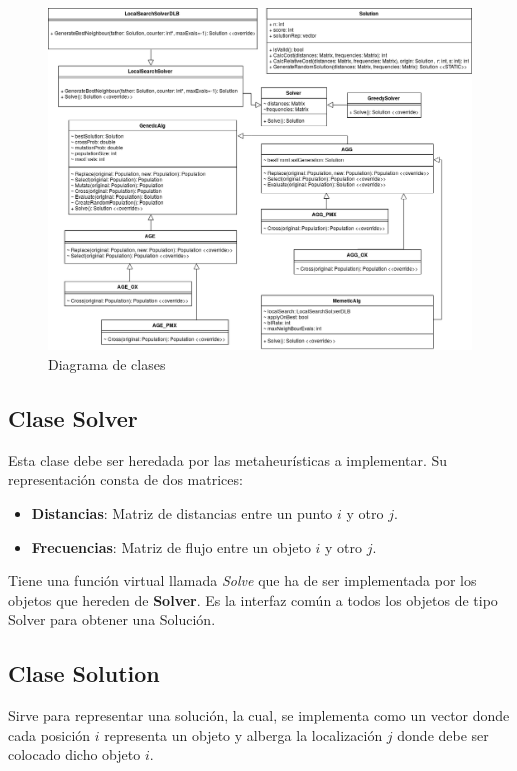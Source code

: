 \documentclass[a4paper, 12pt]{article}
\begin{document}
   \vspace*{0cm}
   \begin{figure}[H]
      \centering
      \includegraphics[scale=0.4]{mhClassDiagram}
      \caption{Diagrama de clases}
   \end{figure}
   
   \newpage
   \subsection{Clase Solver}
   Esta clase debe ser heredada por las metaheurísticas a implementar. Su representación consta de dos matrices:
   \begin{itemize}
      \item \textbf{Distancias}: Matriz de distancias entre un punto $i$ y otro $j$.
      \item \textbf{Frecuencias}: Matriz de flujo entre un objeto $i$ y otro $j$. 
   \end{itemize}
   Tiene una función virtual llamada \textit{Solve} que ha de ser implementada por los objetos que hereden de \textbf{Solver}. Es la interfaz común a todos los objetos de tipo Solver para obtener una Solución.

   \subsection{Clase Solution}
   Sirve para representar una solución, la cual, se implementa como un vector donde cada posición $i$ representa un objeto y alberga la localización $j$ donde debe ser colocado dicho objeto $i$. 
   
\end{document}
